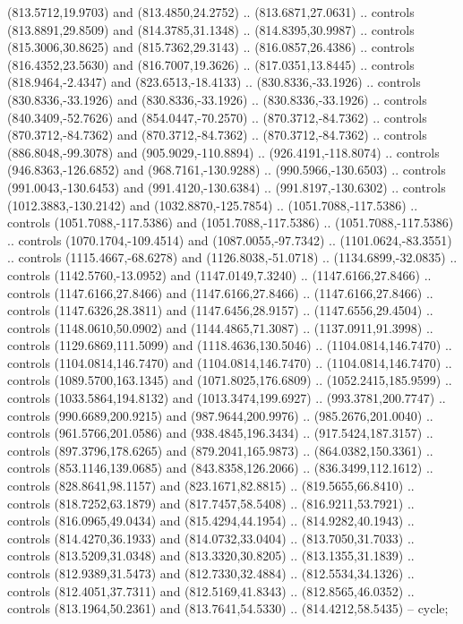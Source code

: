 \begin{scope}[shift={(-127.26916,-608.18524)}]
\begin{scope}
\begin{scope}[shift={(-190.60299,773.9938)},opacity=0.500,transparency group]
        (813.5712,19.9703) and (813.4850,24.2752) .. (813.6871,27.0631) .. controls
        (813.8891,29.8509) and (814.3785,31.1348) .. (814.8395,30.9987) .. controls
        (815.3006,30.8625) and (815.7362,29.3143) .. (816.0857,26.4386) .. controls
        (816.4352,23.5630) and (816.7007,19.3626) .. (817.0351,13.8445) .. controls
        (818.9464,-2.4347) and (823.6513,-18.4133) .. (830.8336,-33.1926) .. controls
        (830.8336,-33.1926) and (830.8336,-33.1926) .. (830.8336,-33.1926) .. controls
        (840.3409,-52.7626) and (854.0447,-70.2570) .. (870.3712,-84.7362) .. controls
        (870.3712,-84.7362) and (870.3712,-84.7362) .. (870.3712,-84.7362) .. controls
        (886.8048,-99.3078) and (905.9029,-110.8894) .. (926.4191,-118.8074) ..
        controls (946.8363,-126.6852) and (968.7161,-130.9288) .. (990.5966,-130.6503)
        .. controls (991.0043,-130.6453) and (991.4120,-130.6384) ..
        (991.8197,-130.6302) .. controls (1012.3883,-130.2142) and
        (1032.8870,-125.7854) .. (1051.7088,-117.5386) .. controls
        (1051.7088,-117.5386) and (1051.7088,-117.5386) .. (1051.7088,-117.5386) ..
        controls (1070.1704,-109.4514) and (1087.0055,-97.7342) ..
        (1101.0624,-83.3551) .. controls (1115.4667,-68.6278) and (1126.8038,-51.0718)
        .. (1134.6899,-32.0835) .. controls (1142.5760,-13.0952) and
        (1147.0149,7.3240) .. (1147.6166,27.8466) .. controls (1147.6166,27.8466) and
        (1147.6166,27.8466) .. (1147.6166,27.8466) .. controls (1147.6326,28.3811) and
        (1147.6456,28.9157) .. (1147.6556,29.4504) .. controls (1148.0610,50.0902) and
        (1144.4865,71.3087) .. (1137.0911,91.3998) .. controls (1129.6869,111.5099)
        and (1118.4636,130.5046) .. (1104.0814,146.7470) .. controls
        (1104.0814,146.7470) and (1104.0814,146.7470) .. (1104.0814,146.7470) ..
        controls (1089.5700,163.1345) and (1071.8025,176.6809) .. (1052.2415,185.9599)
        .. controls (1033.5864,194.8132) and (1013.3474,199.6927) ..
        (993.3781,200.7747) .. controls (990.6689,200.9215) and (987.9644,200.9976) ..
        (985.2676,201.0040) .. controls (961.5766,201.0586) and (938.4845,196.3434) ..
        (917.5424,187.3157) .. controls (897.3796,178.6265) and (879.2041,165.9873) ..
        (864.0382,150.3361) .. controls (853.1146,139.0685) and (843.8358,126.2066) ..
        (836.3499,112.1612) .. controls (828.8641,98.1157) and (823.1671,82.8815) ..
        (819.5655,66.8410) .. controls (818.7252,63.1879) and (817.7457,58.5408) ..
        (816.9211,53.7921) .. controls (816.0965,49.0434) and (815.4294,44.1954) ..
        (814.9282,40.1943) .. controls (814.4270,36.1933) and (814.0732,33.0404) ..
        (813.7050,31.7033) .. controls (813.5209,31.0348) and (813.3320,30.8205) ..
        (813.1355,31.1839) .. controls (812.9389,31.5473) and (812.7330,32.4884) ..
        (812.5534,34.1326) .. controls (812.4051,37.7311) and (812.5169,41.8343) ..
        (812.8565,46.0352) .. controls (813.1964,50.2361) and (813.7641,54.5330) ..
        (814.4212,58.5435) -- cycle;


\end{scope}
\end{scope}
\end{scope}
